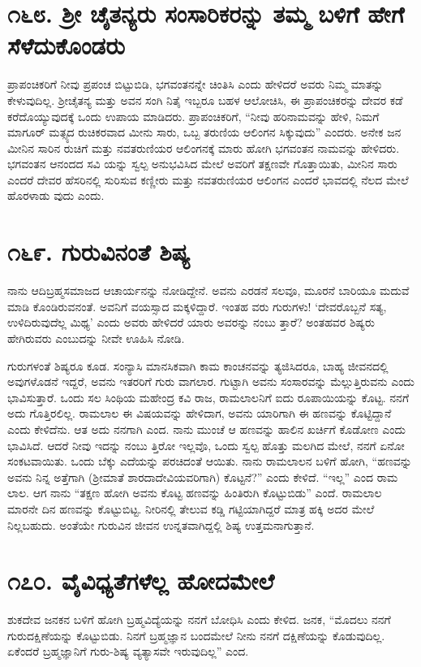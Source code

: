 \section{\num{೧೬೮. } ಶ್ರೀ ಚೈತನ್ಯರು ಸಂಸಾರಿಕರನ್ನು ತಮ್ಮ ಬಳಿಗೆ ಹೇಗೆ ಸೆಳೆದುಕೊಂಡರು}

ಪ್ರಾಪಂಚಿಕರಿಗೆ ನೀವು ಪ್ರಪಂಚ ಬಿಟ್ಟುಬಿಡಿ, ಭಗವಂತನನ್ನೇ ಚಿಂತಿಸಿ ಎಂದು ಹೇಳಿದರೆ ಅವರು ನಿಮ್ಮ ಮಾತನ್ನು ಕೇಳುವುದಿಲ್ಲ. ಶ್ರೀಚೈತನ್ಯ ಮತ್ತು ಅವನ ಸಂಗಿ ನಿತೈ ಇಬ್ಬರೂ ಬಹಳ ಆಲೋಚಿಸಿ, ಈ ಪ್ರಾಪಂಚಿಕರನ್ನು ದೇವರ ಕಡೆ ಕರೆದೊಯ್ಯುವುದಕ್ಕೆ ಒಂದು ಉಪಾಯ ಮಾಡಿದರು. ಪ್ರಾಪಂಚಿಕರಿಗೆ, “ನೀವು ಹರಿನಾಮವನ್ನು ಹೇಳಿ, ನಿಮಗೆ ಮಾಗೂರ್ ಮತ್ಸ್ಯದ ರುಚಿಕರವಾದ ಮೀನು ಸಾರು, ಒಬ್ಬ ತರುಣಿಯ ಆಲಿಂಗನ ಸಿಕ್ಕುವುದು” ಎಂದರು. ಅನೇಕ ಜನ ಮೀನಿನ ಸಾರಿನ ರುಚಿಗೆ ಮತ್ತು ನವತರುಣಿಯರ ಆಲಿಂಗನಕ್ಕೆ ಮಾರು ಹೋಗಿ ಭಗವಂತನ ನಾಮವನ್ನು ಹೇಳಿದರು. ಭಗವಂತನ ಆನಂದದ ಸವಿ ಯನ್ನು ಸ್ವಲ್ಪ ಅನುಭವಿಸಿದ ಮೇಲೆ ಅವರಿಗೆ ತಕ್ಷಣವೇ ಗೊತ್ತಾಯಿತು, ಮೀನಿನ ಸಾರು ಎಂದರೆ ದೇವರ ಹೆಸರಿನಲ್ಲಿ ಸುರಿಸುವ ಕಣ್ಣೀರು ಮತ್ತು ನವತರುಣಿಯರ ಆಲಿಂಗನ ಎಂದರೆ ಭಾವದಲ್ಲಿ ನೆಲದ ಮೇಲೆ ಹೊರಳಾಡು ವುದು ಎಂದು.


\section{\num{೧೬೯. } ಗುರುವಿನಂತೆ ಶಿಷ್ಯ}

ನಾನು ಆದಿಬ್ರಹ್ಮಸಮಾಜದ ಆಚಾರ್ಯನನ್ನು ನೋಡಿದ್ದೇನೆ. ಅವನು ಎರಡನೆ ಸಲವೂ, ಮೂರನೆ ಬಾರಿಯೂ ಮದುವೆ ಮಾಡಿ ಕೊಂಡಿರುವನಂತೆ. ಅವನಿಗೆ ವಯಸ್ಸಾದ ಮಕ್ಕಳಿದ್ದಾರೆ. ಇಂತಹ ವರು ಗುರುಗಳು! ‘ದೇವರೊಬ್ಬನೆ ಸತ್ಯ, ಉಳಿದಿರುವುದೆಲ್ಲ ಮಿಥ್ಯ’ ಎಂದು ಅವರು ಹೇಳಿದರೆ ಯಾರು ಅವರನ್ನು ನಂಬು ತ್ತಾರೆ? ಅಂತಹವರ ಶಿಷ್ಯರು ಹೇಗಿರುವರು ಎಂಬುದನ್ನು ನೀವೇ ಊಹಿಸಿ ನೋಡಿ.

ಗುರುಗಳಂತೆ ಶಿಷ್ಯರೂ ಕೂಡ. ಸಂನ್ಯಾಸಿ ಮಾನಸಿಕವಾಗಿ ಕಾಮ ಕಾಂಚನವನ್ನು ತ್ಯಜಿಸಿದರೂ, ಬಾಹ್ಯ ಜೀವನದಲ್ಲಿ ಅವುಗಳೊಡನೆ ಇದ್ದರೆ, ಅವನು ಇತರರಿಗೆ ಗುರು ವಾಗಲಾರ. ಗುಟ್ಟಾಗಿ ಅವನು ಸಂಸಾರವನ್ನು ಮೆಲ್ಲುತ್ತಿರುವನು ಎಂದು ಭಾವಿಸುತ್ತಾರೆ. ಒಂದು ಸಲ ಸಿಂಥಿಯ ಮಹೇಂದ್ರ ಕವಿ ರಾಜ, ರಾಮಲಾಲನಿಗೆ ಐದು ರೂಪಾಯಿಯನ್ನು ಕೊಟ್ಟ. ನನಗೆ ಅದು ಗೊತ್ತಿರಲಿಲ್ಲ. ರಾಮಲಾಲ ಈ ವಿಷಯವನ್ನು ಹೇಳಿದಾಗ, ಅವನು ಯಾರಿಗಾಗಿ ಈ ಹಣವನ್ನು ಕೊಟ್ಟಿದ್ದಾನೆ ಎಂದು ಕೇಳಿದೆನು. ಆತ ಅದು ನನಗಾಗಿ ಎಂದ. ನಾನು ಮುಂಚೆ ಆ ಹಣವನ್ನು ಹಾಲಿನ ಖರ್ಚಿಗೆ ಕೊಡೋಣ ಎಂದು ಭಾವಿಸಿದೆ. ಆದರೆ ನೀವು ಇದನ್ನು ನಂಬು ತ್ತಿರೋ ಇಲ್ಲವೊ, ಒಂದು ಸ್ವಲ್ಪ ಹೊತ್ತು ಮಲಗಿದ ಮೇಲೆ, ನನಗೆ ಏನೋ ಸಂಕಟವಾಯಿತು. ಒಂದು ಬೆಕ್ಕು ಎದೆಯನ್ನು ಪರಚಿದಂತೆ ಆಯಿತು. ನಾನು ರಾಮಲಾಲನ ಬಳಿಗೆ ಹೋಗಿ, “ಹಣವನ್ನು ಅವನು ನಿನ್ನ ಅತ್ತೆಗಾಗಿ (ಶ್ರೀಮಾತೆ ಶಾರದಾದೇವಿಯವರಿಗಾಗಿ) ಕೊಟ್ಟನೆ?” ಎಂದು ಕೇಳಿದೆ. “ಇಲ್ಲ” ಎಂದ ರಾಮ ಲಾಲ. ಆಗ ನಾನು “ತಕ್ಷಣ ಹೋಗಿ ಅವನು ಕೊಟ್ಟ ಹಣವನ್ನು ಹಿಂತಿರುಗಿ ಕೊಟ್ಟುಬಿಡು” ಎಂದೆ. ರಾಮಲಾಲ ಮಾರನೇ ದಿನ ಹಣವನ್ನು ಕೊಟ್ಟುಬಿಟ್ಟ. ನೀರಿನಲ್ಲಿ ತೇಲುವ ಕಡ್ಡಿ ಗಟ್ಟಿಯಾಗಿದ್ದರೆ ಮಾತ್ರ ಹಕ್ಕಿ ಅದರ ಮೇಲೆ ನಿಲ್ಲಬಹುದು. ಅಂತೆಯೇ ಗುರುವಿನ ಜೀವನ ಉನ್ನತವಾಗಿದ್ದಲ್ಲಿ ಶಿಷ್ಯ ಉತ್ತಮನಾಗುತ್ತಾನೆ.


\section{\num{೧೭೦. } ವೈವಿಧ್ಯತೆಗಳೆಲ್ಲ ಹೋದಮೇಲೆ}

ಶುಕದೇವ ಜನಕನ ಬಳಿಗೆ ಹೋಗಿ ಬ್ರಹ್ಮವಿದ್ಯೆಯನ್ನು ನನಗೆ ಬೋಧಿಸಿ ಎಂದು ಕೇಳಿದ. ಜನಕ, “ಮೊದಲು ನನಗೆ ಗುರುದಕ್ಷಿಣೆಯನ್ನು ಕೊಟ್ಟುಬಿಡು. ನಿನಗೆ ಬ್ರಹ್ಮಜ್ಞಾನ ಬಂದಮೇಲೆ ನೀನು ನನಗೆ ದಕ್ಷಿಣೆಯನ್ನು ಕೊಡುವುದಿಲ್ಲ. ಏಕೆಂದರೆ ಬ್ರಹ್ಮಜ್ಞಾನಿಗೆ ಗುರು-ಶಿಷ್ಯ ವ್ಯತ್ಯಾಸವೇ ಇರುವುದಿಲ್ಲ” ಎಂದ.

